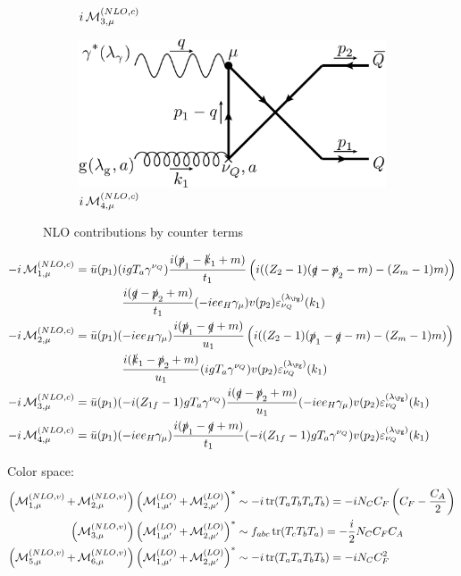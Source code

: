 \begin{figure}[ht!]
\begin{subfigure}[t]{.4\textwidth}
		\caption{$i\operatorname{\mathcal M}^{(NLO,c)}_{3,\mu}$}
	\end{subfigure}\hspace{.15\textwidth}%
	\begin{subfigure}[t]{.4\textwidth}
		\includegraphics[width=\textwidth]{pyfeyn/nlo-c-nuQcr}
		\caption{$i\operatorname{\mathcal M}^{(NLO,c)}_{4,\mu}$}
	\end{subfigure}
	\caption{NLO contributions by counter terms}\label{fig:FeynNLOvf}
\end{figure}

\begin{align}
-i\Md^{(NLO,c)}_{1,\mu} &=\bar u(p_1)(igT_a\gamma^{\nu_Q})\frac{i(\slashed{p}_1-\slashed{k}_1+m)}{t_1}\left(i((Z_2-1)(\slashed{q} - \slashed{p}_2- m) - (Z_m-1)m)\right)\nonumber\\
&\hspace{40pt}\frac{i(\slashed{q}-\slashed{p}_2+m)}{t_1}(-i e e_H \gamma_\mu)v(p_2)\varepsilon^{(\lambda_{\Pg})}_{\nu_Q}(k_1)\\
-i\Md^{(NLO,c)}_{2,\mu} &=\bar u(p_1)(-i e e_H \gamma_\mu)\frac{i(\slashed{p}_1-\slashed{q}+m)}{u_1}\left(i((Z_2-1)(\slashed{p}_1 - \slashed{q}- m) - (Z_m-1)m)\right)\nonumber\\
&\hspace{40pt}\frac{i(\slashed{k}_1-\slashed{p}_2+m)}{u_1}(igT_a\gamma^{\nu_Q})v(p_2)\varepsilon^{(\lambda_{\Pg})}_{\nu_Q}(k_1)\\
-i\Md^{(NLO,c)}_{3,\mu} &=\bar u(p_1)(-i(Z_{1f}-1)gT_a\gamma^{\nu_Q})\frac{i(\slashed{q}-\slashed{p}_2+m)}{u_1}(-i e e_H \gamma_\mu)v(p_2)\varepsilon^{(\lambda_{\Pg})}_{\nu_Q}(k_1)\\
-i\Md^{(NLO,c)}_{4,\mu} &=\bar u(p_1)(-i e e_H \gamma_\mu)\frac{i(\slashed{p}_1-\slashed{q}+m)}{t_1}(-i(Z_{1f}-1)gT_a\gamma^{\nu_Q})v(p_2)\varepsilon^{(\lambda_{\Pg})}_{\nu_Q}(k_1)
\end{align}

Color space:
\begin{align}
\left(\operatorname{\mathcal M}^{(NLO,v)}_{1,\mu}+\operatorname{\mathcal M}^{(NLO,v)}_{2,\mu}\right)\left(\operatorname{\mathcal M}^{(LO)}_{1,\mu'}+\operatorname{\mathcal M}^{(LO)}_{2,\mu'}\right)^*&\sim -i\operatorname{\text{tr}}(T_aT_bT_aT_b) = -iN_C C_F \left(C_F - \frac{C_A}{2}\right)\\
\left(\operatorname{\mathcal M}^{(NLO,v)}_{3,\mu}\right)\left(\operatorname{\mathcal M}^{(LO)}_{1,\mu'}+\operatorname{\mathcal M}^{(LO)}_{2,\mu'}\right)^*&\sim f_{abc}\operatorname{\text{tr}}(T_cT_bT_a) = -\frac i 2 N_C C_F C_A\\
\left(\operatorname{\mathcal M}^{(NLO,v)}_{5,\mu}+\operatorname{\mathcal M}^{(NLO,v)}_{6,\mu}\right)\left(\operatorname{\mathcal M}^{(LO)}_{1,\mu'}+\operatorname{\mathcal M}^{(LO)}_{2,\mu'}\right)^*&\sim -i\operatorname{\text{tr}}(T_aT_aT_bT_b) = -iN_C C_F^2\\
\end{align}

